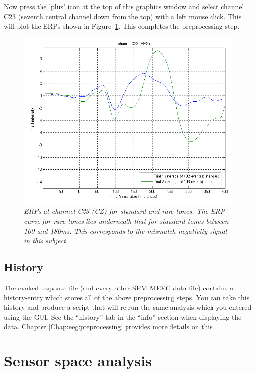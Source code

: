 Now press the 'plus' icon at the top of this graphics window and select channel C23 (seventh central channel down from the top) with a left mouse click. This will plot the ERPs shown in Figure~\ref{c23}. This completes the preprocessing step.
\begin{figure}
\begin{center}
\includegraphics[width=120mm]{mmn/erp_c23}
\caption{\em ERPs at channel C23 (CZ) for standard and rare tones. The ERP curve for rare tones lies underneath that for standard tones between 100 and 180ms. This corresponds to the mismatch negativity signal in this subject. \label{c23}}
\end{center}
\end{figure}

\subsection{History}
The evoked response file (and every other SPM MEEG data file) contains a history-entry which stores all of the above preprocessing steps. You can take this history and produce a script that will re-run the same analysis which you entered using the GUI. See the ``history'' tab in the ``info'' section when displaying the data. Chapter \ref{Chap:eeg:preprocessing} provides more details on this.

\section{Sensor space analysis}

